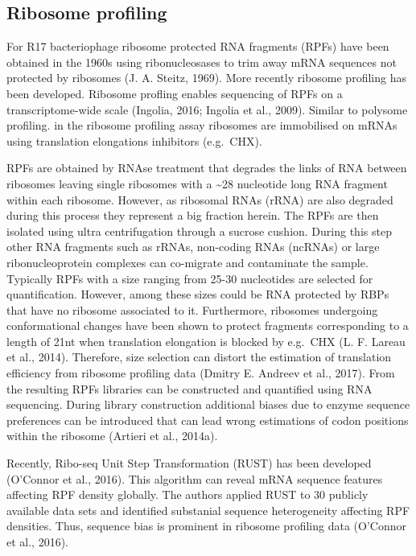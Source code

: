 \documentclass[12pt,openany]{book}
\begin{document}
\subsection{Ribosome profiling} \label{riboseq}

For R17 bacteriophage ribosome protected RNA fragments (RPFs) have been
obtained in the 1960s using ribonucleosases to trim away mRNA sequences
not protected by ribosomes (J. A. Steitz, 1969). More recently ribosome
profiling has been developed. Ribosome profling enables sequencing of
RPFs on a transcriptome-wide scale (Ingolia, 2016; Ingolia et al.,
2009). Similar to polysome profiling. in the ribosome profiling assay
ribosomes are immobilised on mRNAs using translation elongations
inhibitors (e.g.~CHX).

RPFs are obtained by RNAse treatment that degrades the links of RNA
between ribosomes leaving single ribosomes with a \textasciitilde{}28
nucleotide long RNA fragment within each ribosome. However, as ribosomal
RNAs (rRNA) are also degraded during this process they represent a big
fraction herein. The RPFs are then isolated using ultra centrifugation
through a sucrose cushion. During this step other RNA fragments such as
rRNAs, non-coding RNAs (ncRNAs) or large ribonucleoprotein complexes can
co-migrate and contaminate the sample. Typically RPFs with a size
ranging from 25-30 nucleotides are selected for quantification. However,
among these sizes could be RNA protected by RBPs that have no ribosome
associated to it. Furthermore, ribosomes undergoing conformational
changes have been shown to protect fragments corresponding to a length
of 21nt when translation elongation is blocked by e.g.~CHX (L. F. Lareau
et al., 2014). Therefore, size selection can distort the estimation of
translation efficiency from ribosome profiling data (Dmitry E. Andreev
et al., 2017). From the resulting RPFs libraries can be constructed and
quantified using RNA sequencing. During library construction additional
biases due to enzyme sequence preferences can be introduced that can
lead wrong estimations of codon positions within the ribosome (Artieri
et al., 2014a).

Recently, Ribo-seq Unit Step Transformation (RUST) has been developed
(O'Connor et al., 2016). This algorithm can reveal mRNA sequence
features affecting RPF density globally. The authors applied RUST to 30
publicly available data sets and identified substanial sequence
heterogeneity affecting RPF densities. Thus, sequence bias is prominent
in ribosome profiling data (O'Connor et al., 2016).
\end{document}
